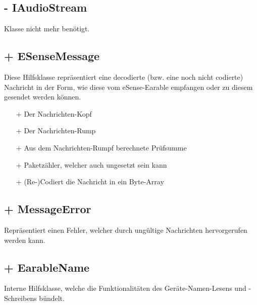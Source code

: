 \documentclass[../implementierung.tex]{subfiles}
\begin{document}
		\subsection{- IAudioStream}
			Klasse nicht mehr benötigt.

		\subsection{+ ESenseMessage}
			Diese Hilfsklasse repräsentiert eine decodierte (bzw. eine noch nicht codierte) Nachricht in der Form,
			wie diese vom eSense-Earable empfangen oder zu diesem gesendet werden können.
			\begin{itemize}
				\item[+]{ Der Nachrichten-Kopf}
				\item[+]{ Der Nachrichten-Rump}
				\item[+]{ Aus dem Nachrichten-Rumpf berechnete Prüfsumme}
				\item[+]{ Paketzähler, welcher auch ungesetzt sein kann}
				\item[+]{ (Re-)Codiert die Nachricht in ein Byte-Array}
			\end{itemize}

		\subsection{+ MessageError}
			Repräsentiert einen Fehler, welcher durch ungültige Nachrichten hervorgerufen werden kann.

		\subsection{+ EarableName}
			Interne Hilfsklasse, welche die Funktionalitäten des Geräte-Namen-Lesens und -Schreibens bündelt.
\end{document}
